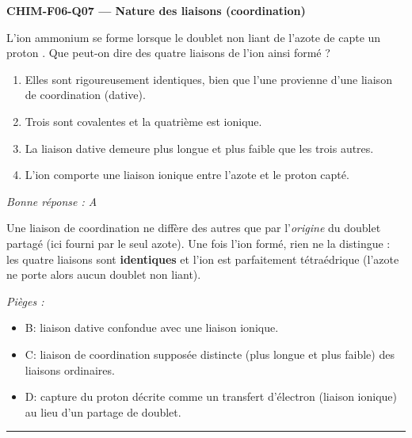 \documentclass[11pt,a4paper]{article}
\begin{document}
\noindent\textbf{CHIM-F06-Q07 --- Nature des liaisons (coordination)}\par
L'ion ammonium  se forme lorsque le doublet non liant de l'azote de  capte un
proton . Que peut-on dire des quatre liaisons  de l'ion ainsi formé ?
\begin{enumerate}[label=\Alph*)]
\item Elles sont rigoureusement identiques, bien que l'une provienne d'une liaison de coordination (dative).
\item Trois sont covalentes et la quatrième est ionique.
\item La liaison dative demeure plus longue et plus faible que les trois autres.
\item L'ion comporte une liaison ionique entre l'azote et le proton capté.
\end{enumerate}
\textit{Bonne réponse : A}\par
Une liaison de coordination ne diffère des autres que par l'\emph{origine} du doublet partagé (ici
fourni par le seul azote). Une fois l'ion formé, rien ne la distingue : les quatre liaisons 
sont \textbf{identiques} et l'ion  est parfaitement tétraédrique (l'azote ne porte alors
aucun doublet non liant).\par
\textit{Pièges :}
\begin{itemize}
\item B: liaison dative confondue avec une liaison ionique.
\item C: liaison de coordination supposée distincte (plus longue et plus faible) des liaisons ordinaires.
\item D: capture du proton décrite comme un transfert d'électron (liaison ionique) au lieu d'un partage de doublet.
\end{itemize}
\vspace{8pt}\hrule\vspace{8pt}
\end{document}
